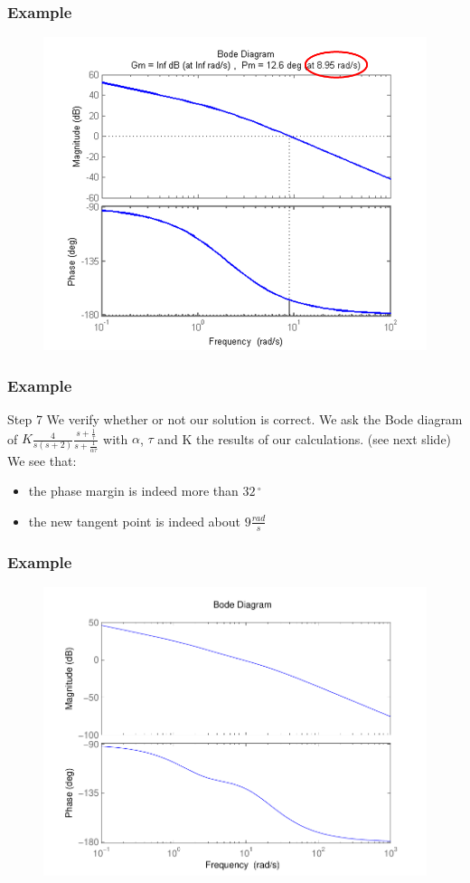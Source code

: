 \begin{frame}
\frametitle{Example}
\begin{figure}
	\centering
	\includegraphics[width=0.7
	\linewidth]{exampleleadstep6}
\end{figure}
\end{frame}

\begin{frame}
	\frametitle{Example}
	\begin{block}{Step 7}
	We verify whether or not our solution is correct. We ask the Bode diagram of $K \frac{4}{s(s+2)} \frac{s+\frac{1}{\tau}}{s+\frac{1}{\alpha\tau}}$ with $\alpha$, $\tau$ and K the results of our calculations. (see next slide) \\
	We see that: 
	\begin{itemize}
		\item the phase margin is indeed more than $32\,^{\circ}$ 
		\item the new tangent point is indeed about $9\frac{rad}{s}$
	\end{itemize} 
	\end{block}
\end{frame}

\begin{frame}
\frametitle{Example}
\begin{figure}
	\centering
	\includegraphics[width=0.7
	\linewidth]{bodesolutionexamplelead}
\end{figure}
\end{frame}

